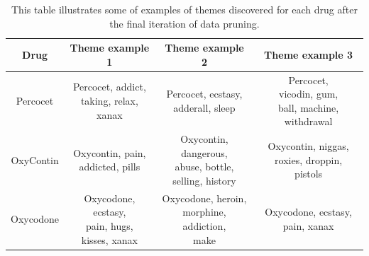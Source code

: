 \begin{table}
\begin{tabular}{|c|c|c|c|}
\hline
Drug & Theme example 1 & Theme example 2 & Theme example 3 \\
\hline
Percocet & \pbox{20cm}{Percocet, addict, \\taking, relax, xanax} & \pbox{20cm}{Percocet, ecstasy, \\adderall, sleep}&\pbox{20cm}{ Percocet,\\ vicodin, gum, \\ball, machine, withdrawal}\\
\hline
OxyContin &  \pbox{20cm}{Oxycontin, pain,\\ addicted, pills} &  \pbox{20cm}{Oxycontin, dangerous, \\abuse, bottle, \\selling, history} & \pbox{20cm}{Oxycontin, niggas, \\roxies, droppin, \\pistols}\\
\hline
Oxycodone& \pbox{20cm}{Oxycodone, ecstasy, \\pain, hugs, \\kisses, xanax}& \pbox{20cm}{Oxycodone, heroin,\\ morphine, addiction,\\ make} &  \pbox{20cm}{Oxycodone, ecstasy, \\pain, xanax}\\
\hline
\end{tabular}
\caption[Example themes after final iteration]{This table illustrates some of examples of themes discovered for each drug after the final iteration of data pruning.}
\label{table:theme_examples_final}
\end{table}
